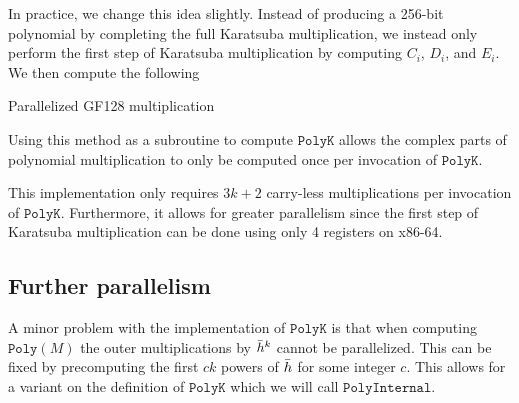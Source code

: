 \documentclass[hctr2.tex]{subfiles}
\begin{document}
In practice, we change this idea slightly. Instead of producing a 256-bit polynomial by completing the full Karatsuba multiplication, we instead only perform the first step of Karatsuba multiplication by computing $C_i$, $D_i$, and $E_i$. We then compute the following
\begin{algorithm}[H]
	\caption{Parallelized GF128 multiplication}\label{parallelgf128}
\end{algorithm}
Using this method as a subroutine to compute $\texttt{PolyK}$ allows the complex parts of polynomial multiplication to only be computed once per invocation of $\texttt{PolyK}$.

This implementation only requires $3k + 2$ carry-less multiplications per invocation of $\texttt{PolyK}$. Furthermore, it allows for greater parallelism since the first step of Karatsuba multiplication can be done using only 4 registers on x86-64.

\subsection{Further parallelism}
A minor problem with the implementation of $\texttt{PolyK}$ is that when computing $\texttt{Poly}(M)$ the outer multiplications by $\bar{h}^{k}$ cannot be parallelized. This can be fixed by precomputing the first $ck$ powers of $\bar{h}$ for some integer $c$. This allows for a variant on the definition of $\texttt{PolyK}$ which we will call $\texttt{PolyInternal}$.
\end{document}
